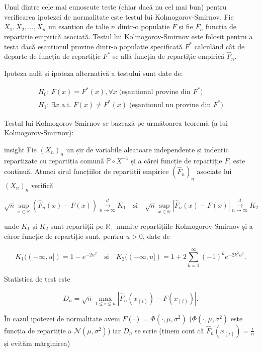 \documentclass[]{article}
\newenvironment{frshaded_insight*}{%
  \def\FrameCommand{\fboxrule=\FrameRule\fboxsep=\FrameSep \fcolorbox{framecolor_insight}{shadecolor_insight}}%
  \MakeFramed {\advance\hsize-\width \FrameRestore}}%
{\endMakeFramed}
\newenvironment{rmdblock_insight}[1]
  {\begin{frshaded_insight*}
  \begin{itemize}
  \renewcommand{\labelitemi}{
    \raisebox{-.7\height}[0pt][0pt]{
      {\setkeys{Gin}{width=2em,keepaspectratio}\texttt{[image: images/icons/\#1]}}
    }
  }
  \item
  }
  {
  \end{itemize}
  \end{frshaded_insight*}
  }
\newenvironment{rmdinsight}
  {\begin{rmdblock_insight}{insight}}
  {\end{rmdblock_insight}}
\begin{document}
Unul dintre cele mai cunoscute teste (chiar dacă nu cel mai bun) pentru
verificarea ipotezei de normalitate este testul lui Kolmogorov-Smirnov.
Fie \(X_1, X_2, \ldots, X_n\) un eșantion de talie \(n\) dintr-o
populație \(F\) și fie \(\hat{F}_n\) funcția de repartiție empirică
asociată. Testul lui Kolmogorov-Smirnov este folosit pentru a testa dacă
eșantionul provine dintr-o populație specificată \(F^*\) calculând cât
de departe de funcția de repartiție \(F^*\) se află funcția de
repartiție empirică \(\hat{F}_n\).

Ipoteza nulă și ipoteza alternativă a testului sunt date de:

\[
\begin{array}{ll}
  H_0:\, F(x) = F^*(x), \forall x\; \text{(eșantionul provine din $F^*$)}\\
  H_1:\, \exists x \text{ a.i. } F(x) \neq F^*(x) \; \text{(eșantionul nu provine din $F^*$)}
\end{array}
\]

Testul lui Kolmogorov-Smirnov se bazează pe următoarea teoremă (a lui
Kolmogorov-Smirnov):

\begin{rmdinsight}
Fie \((X_n)_n\) un șir de variabile aleatoare independente și indentic
repartizate cu repartiția comună \(\mathbb{P}\circ X^{-1}\) și a cărei
funcție de repartiție \(F\), este continuă. Atunci șirul funcțiilor de
repartiții empirice \((\hat{F}_n)_n\) asociate lui \((X_n)_n\) verifică

\[
  \sqrt{n}\sup_{x\in\mathbb{R}}\left(\hat{F}_n(x) - F(x)\right) \overset{d}{\underset{n\to\infty}{\longrightarrow}} K_1 \quad \text{si} \quad \sqrt{n}\sup_{x\in\mathbb{R}}\left|\hat{F}_n(x) - F(x)\right| \overset{d}{\underset{n\to\infty}{\longrightarrow}} K_2
\]

unde \(K_1\) și \(K_2\) sunt repartiții pe \(\mathbb{R}_+\) numite
repartițiile Kolmogorov-Smirnov și a căror funcție de repartiție sunt,
pentru \(u>0\), date de

\[
  K_1((-\infty, u]) = 1 - e^{-2u^2} \quad \text{si} \quad  K_2((-\infty, u]) = 1+2\sum_{k=1}^{\infty}(-1)^ke^{-2k^2u^2}. 
\]
\end{rmdinsight}

Statistica de test este

\[
  D_n = \sqrt{n}\max_{1\leq i\leq n}\left|\hat{F}_n(x_{(i)}) - F(x_{(i)})\right|.
\]

În cazul ipotezei de normalitate avem
\(F(\cdot) = \Phi(\cdot, \mu, \sigma^2)\)
(\(\Phi(\cdot, \mu, \sigma^2)\) este funcția de repartiție a
\(\mathcal{N}(\mu, \sigma^2)\)) iar \(D_n\) se scrie (ținem cont că
\(\hat{F}_n(x_{(i)}) = \frac{i}{n}\) și evităm mărginirea)
\end{document}
